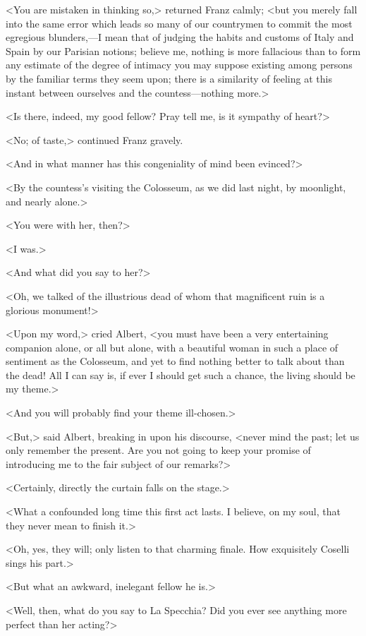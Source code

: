  <You are mistaken in thinking so,> returned Franz calmly; <but you merely fall into the same error which leads so many of our countrymen to commit the most egregious blunders,—I mean that of judging the habits and customs of Italy and Spain by our Parisian notions; believe me, nothing is more fallacious than to form any estimate of the degree of intimacy you may suppose existing among persons by the familiar terms they seem upon; there is a similarity of feeling at this instant between ourselves and the countess—nothing more.> 

 <Is there, indeed, my good fellow? Pray tell me, is it sympathy of heart?> 

 <No; of taste,> continued Franz gravely. 

 <And in what manner has this congeniality of mind been evinced?> 

 <By the countess's visiting the Colosseum, as we did last night, by moonlight, and nearly alone.> 

 <You were with her, then?> 

 <I was.> 

 <And what did you say to her?> 

 <Oh, we talked of the illustrious dead of whom that magnificent ruin is a glorious monument!> 

 <Upon my word,> cried Albert, <you must have been a very entertaining companion alone, or all but alone, with a beautiful woman in such a place of sentiment as the Colosseum, and yet to find nothing better to talk about than the dead! All I can say is, if ever I should get such a chance, the living should be my theme.>

<And you will probably find your theme ill-chosen.> 

 <But,> said Albert, breaking in upon his discourse, <never mind the past; let us only remember the present. Are you not going to keep your promise of introducing me to the fair subject of our remarks?> 

 <Certainly, directly the curtain falls on the stage.> 

 <What a confounded long time this first act lasts. I believe, on my soul, that they never mean to finish it.> 

 <Oh, yes, they will; only listen to that charming finale. How exquisitely Coselli sings his part.> 

 <But what an awkward, inelegant fellow he is.> 

 <Well, then, what do you say to La Specchia? Did you ever see anything more perfect than her acting?> 

